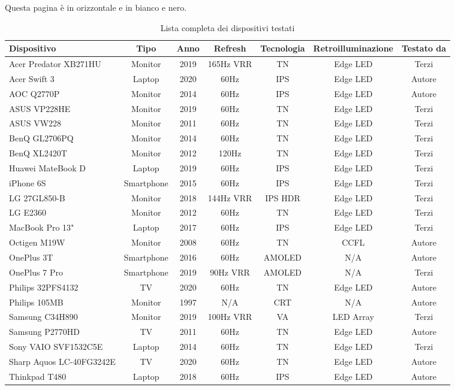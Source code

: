 \documentclass[12pt,a4paper]{report}
\begin{document}
	\begin{landscape}
		\centering Questa pagina è in orizzontale e in bianco e nero.
		
		\begin{table}[H]
			\centering
			\begin{tabular}{|l|c|c|c|c|c|c|} 
				\hline
				\textbf{Dispositivo} & \textbf{Tipo} & \textbf{Anno} & \textbf{Refresh} & \textbf{Tecnologia} & \textbf{Retroilluminazione} & \textbf{Testato da}  \\ 
				\hline
				Acer Predator XB271HU & Monitor & 2019 & 165Hz VRR & TN  & Edge LED & Terzi \\ \hline
				Acer Swift 3 & Laptop & 2020 & 60Hz & IPS & Edge LED & Autore \\ \hline
				AOC Q2770P & Monitor & 2014 & 60Hz & IPS & Edge LED & Autore \\ \hline
				ASUS VP228HE & Monitor & 2019 & 60Hz & TN & Edge LED & Terzi \\ \hline
				ASUS VW228 & Monitor & 2011 & 60Hz & TN & Edge LED & Terzi \\ \hline
				BenQ GL2706PQ & Monitor & 2014 & 60Hz & TN & Edge LED & Terzi \\ \hline
				BenQ XL2420T & Monitor & 2012 & 120Hz & TN & Edge LED & Terzi \\ \hline
				Huawei MateBook D & Laptop & 2019 & 60Hz & IPS & Edge LED & Terzi \\ \hline
				iPhone 6S & Smartphone & 2015 & 60Hz & IPS & Edge LED & Terzi \\ \hline
				LG 27GL850-B & Monitor & 2018 & 144Hz VRR & IPS HDR & Edge LED & Terzi \\ \hline
				LG E2360 & Monitor & 2012 & 60Hz & TN & Edge LED & Terzi \\ \hline
				MacBook Pro 13" & Laptop & 2017 & 60Hz & IPS & Edge LED & Terzi \\ \hline
				Octigen M19W & Monitor & 2008 & 60Hz & TN & CCFL & Autore \\ \hline
				OnePlus 3T & Smartphone & 2016 & 60Hz & AMOLED & N/A & Autore \\ \hline
				OnePlus 7 Pro & Smartphone & 2019 & 90Hz VRR & AMOLED & N/A & Terzi \\ \hline
				Philips 32PFS4132 & TV & 2020 & 60Hz & TN & Edge LED & Autore \\ \hline
				Philips 105MB & Monitor & 1997 & N/A & CRT & N/A & Autore \\ \hline
				Samsung C34H890 & Monitor & 2019 & 100Hz VRR & VA & LED Array & Terzi \\ \hline
				Samsung P2770HD & TV & 2011 & 60Hz & TN & Edge LED & Autore \\ \hline
				Sony VAIO SVF1532C5E & Laptop & 2014 & 60Hz & TN & Edge LED & Terzi \\ \hline
				Sharp Aquos LC-40FG3242E & TV & 2020 & 60Hz & TN & Edge LED & Autore \\ \hline
				Thinkpad T480 & Laptop & 2018 & 60Hz & IPS & Edge LED & Autore \\ \hline
			\end{tabular}
			\caption{\label{tab:display_list}Lista completa dei dispositivi testati}
		\end{table}
	\end{landscape}
\end{document}
